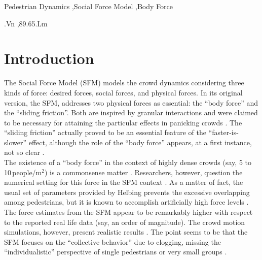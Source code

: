 \documentclass[preprint,12pt]{elsarticle}
\begin{document}
\begin{frontmatter}
\begin{abstract}
\end{abstract}

\begin{keyword}

Pedestrian Dynamics \sep Social Force Model \sep Body Force


.Vn \sep 89.65.Lm

\end{keyword}

\end{frontmatter}


\section{\label{introduction}Introduction}

The Social Force Model (SFM) models the crowd dynamics  considering three kinds
of force: desired forces, social forces, and physical forces. In its original
version, the SFM, addresses two physical forces as essential:   the ``body
force'' and the ``sliding friction''. Both are  inspired by granular
interactions and were claimed to be necessary   for attaining the particular
effects in panicking crowds \cite{helbing_2000}.  The ``sliding friction''
actually proved to be an essential feature of the  ``faster-is-slower'' effect,
although the role of the ``body force'' appears,  at a first instance, not so
clear \cite{dorso_2005,dorso_2007,dorso_2011}. \\

The existence of a ``body force'' in the context of highly dense crowds (say, 5
to 10$\,$people/m$^2$) is a commonsense matter \cite{henein_2007,fruin_1993}.
Researchers, however, question the numerical setting for this force in  the SFM
context \cite{lakoba_2005}. As a matter of fact, the usual   set of parameters
provided by  Helbing prevents the excessive overlapping among pedestrians, but
it is known to  accomplish artificially high force levels
\cite{helbing_2000,lakoba_2005,langston_2006,lin_2017}. The force estimates from
the SFM appear to be remarkably higher with respect to the reported real life
data (say, an order of magnitude). The crowd motion simulations, however,
present realistic results \cite{lakoba_2005,langston_2006,dorso_2017}.  The
point seems to be that the SFM focuses on the ``collective behavior'' due  to
clogging, missing the ``individualistic'' perspective  of single pedestrians  or
very small groups \cite{helbing_2000,henein_2007,narain_2009}.  \\
\end{document}
